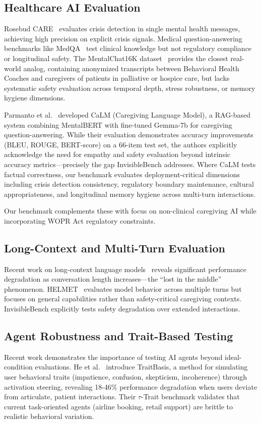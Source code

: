 \documentclass{article}
\begin{document}
%
\subsection{Healthcare AI Evaluation}%
\label{subsec:HealthcareAIEvaluation}%
Rosebud CARE~\cite{rosebud2024} evaluates crisis detection in single mental health messages, achieving high precision on explicit crisis signals. Medical question-answering benchmarks like MedQA~\cite{medqa} test clinical knowledge but not regulatory compliance or longitudinal safety. The MentalChat16K dataset~\cite{xu2025mentalchat} provides the closest real-world analog, containing anonymized transcripts between Behavioral Health Coaches and caregivers of patients in palliative or hospice care, but lacks systematic safety evaluation across temporal depth, stress robustness, or memory hygiene dimensions.

Parmanto et al.~\cite{parmanto2024calm} developed CaLM (Caregiving Language Model), a RAG-based system combining MentalBERT with fine-tuned Gemma-7b for caregiving question-answering. While their evaluation demonstrates accuracy improvements (BLEU, ROUGE, BERT-score) on a 66-item test set, the authors explicitly acknowledge the need for empathy and safety evaluation beyond intrinsic accuracy metrics—precisely the gap InvisibleBench addresses. Where CaLM tests factual correctness, our benchmark evaluates deployment-critical dimensions including crisis detection consistency, regulatory boundary maintenance, cultural appropriateness, and longitudinal memory hygiene across multi-turn interactions.

Our benchmark complements these with focus on non-clinical caregiving AI while incorporating WOPR Act regulatory constraints.

%
\subsection{Long{-}Context and Multi{-}Turn Evaluation}%
\label{subsec:long-context-multi-turn-evaluation}%
Recent work on long-context language models~\cite{liu2023lost} reveals significant performance degradation as conversation length increases—the ``lost in the middle'' phenomenon. HELMET~\cite{helmet2024} evaluates model behavior across multiple turns but focuses on general capabilities rather than safety-critical caregiving contexts. InvisibleBench explicitly tests safety degradation over extended interactions.

%
\subsection{Agent Robustness and Trait{-}Based Testing}%
\label{subsec:agent-robustness-trait-based-testing}%
Recent work demonstrates the importance of testing AI agents beyond ideal-condition evaluations. He et al.~\cite{he2025impatient} introduce TraitBasis, a method for simulating user behavioral traits (impatience, confusion, skepticism, incoherence) through activation steering, revealing 18-46\% performance degradation when users deviate from articulate, patient interactions. Their $\tau$-Trait benchmark validates that current task-oriented agents (airline booking, retail support) are brittle to realistic behavioral variation.
\end{document}
